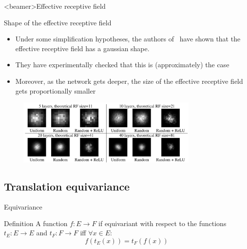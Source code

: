 \documentclass[xcolor=pdftex,dvipsnames,table,mathserif]{beamer}
\begin{document}
\begin{frame}<beamer>{Effective receptive field}

\begin{block}{Shape of the effective receptive field}
\begin{itemize}
\item   Under some simplification hypotheses, the authors of~\cite{luo_understanding_2017} have shown that the effective receptive field has a gaussian shape.
  \item They have experimentally checked that this is (approximately) the case
  \item Moreover, as the network gets deeper, the size of the effective receptive field gets proportionally smaller
\end{itemize}

\end{block}

  \begin{figure}
    \includegraphics[width=0.8\textwidth]{effective_receptive_field.png}
  \end{figure}



\end{frame}


\subsection{Translation equivariance}

\begin{frame}{Equivariance}

\begin{block}{Definition}
  A function $f: E \longrightarrow F$ if equivariant with respect to the functions $t_E: E \longrightarrow E$ and $t_F: F \longrightarrow F$ iff $\forall x \in E$:
  \[
  f(t_E(x)) = t_F(f(x))
  \]
\end{block}

\end{frame}
\end{document}
